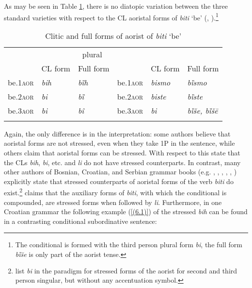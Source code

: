 As may be seen in Table \ref{table:clbitiao}, there is no diatopic variation between the three standard varieties with respect to the CL aoristal forms of \textit{biti} `be' (\citealt[cf.][271]{Baric97}, \citealt[128]{MrazovicVukadinovic09}).\footnote{The conditional is formed with the third person plural form \textit{bi}, the full form \textit{bȉše} is only part of the aorist tense.} 


\begin{table}
\caption{Clitic and full forms of aorist of \textit{biti} `be'\label{table:clbitiao}}
\begin{tabular}{llllll}
\lsptoprule
\multicolumn{3}{c}{singular} & \multicolumn{3}{c}{plural} \\\cmidrule(rl){1-3}\cmidrule(rl){4-6}
 &CL form & Full form && CL form & Full form\\\midrule
be.\textsc{1aor} & \textit{bih}	& \textit{bȉh} & be.\textsc{1aor} & \textit{bismo} & \textit{bȉsmo}\\
be.\textsc{2aor} & \textit{bi}	& \textit{bȉ} & be.\textsc{2aor} & \textit{biste} & \textit{bȉste}\\
be.\textsc{3aor} & \textit{bi}	& \textit{bî} & be.\textsc{3aor} & \textit{bi} & \textit{bȉše, bȉšē}\\
\lspbottomrule
\end{tabular}
\end{table}


Again, the only difference is in the interpretation: some authors believe that aoristal forms are not stressed, even when they take 1P in the sentence, while others claim that aoristal forms can be stressed. With respect to this \citet[28]{PiperKlajn14} state that the CLs \textit{bih}, \textit{bi}, etc. and \textit{li} do not have stressed counterparts. In contrast, many other authors of Bosnian, Croatian, and Serbian grammar books (e.g. \citealt[498]{Katicic86}, \citealt[246]{TezakBabic96}, \citealt[272]{JHP00}, \citealt[284]{Popovic04}, \citealt[124]{MrazovicVukadinovic09}, \citealt[264, 565]{Ridjanovic12}) explicitly state that stressed counterparts of aoristal forms of the verb \textit{biti} do exist.\footnote{\citet[271]{Baric97} list \textit{bi} in the paradigm for stressed forms of the aorist for second and third person singular, but without any accentuation symbol.} \citet[498]{Katicic86} claims that the auxiliary forms of \textit{biti}, with which the conditional is compounded, are stressed forms when followed by \textit{li}. Furthermore, in one Croatian grammar the following example (\ref{(6.1)}) of the stressed \textit{bih} can be found in a contrasting conditional subordinative sentence:

